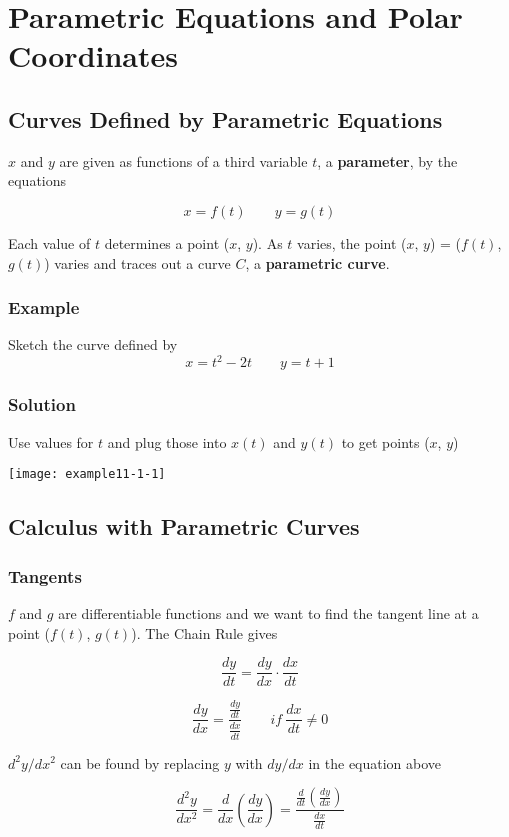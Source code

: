 \setcounter{chapter}{10}
\chapter{Parametric Equations and Polar Coordinates}

\section{Curves Defined by Parametric Equations}

$x$ and $y$ are given as functions of a third variable $t$,
a \textbf{parameter}, by the equations

$$ x = f(t) \qquad y = g(t) $$

Each value of $t$ determines a point ($x$, $y$).
As $t$ varies, the point ($x$, $y$) = ($f(t)$, $g(t)$)
varies and traces out a curve $C$, a \textbf{parametric curve}.

\subsection*{Example}

Sketch the curve defined by
$$ x = t^2-2t \qquad y = t+1 $$

\subsection*{Solution}
Use values for $t$ and plug those into $x(t)$ and $y(t)$ to get points ($x$, $y$)

\texttt{[image: example11-1-1]}

\section{Calculus with Parametric Curves}

\subsection*{Tangents}
$f$ and $g$ are differentiable functions and we want to find the
tangent line at a point ($f(t)$, $g(t)$). The Chain Rule gives

$$ \frac{dy}{dt} = \frac{dy}{dx} \cdot \frac{dx}{dt} $$

$$ \frac{dy}{dx} = \frac{\frac{dy}{dt}}{\frac{dx}{dt}} \qquad if \: \frac{dx}{dt} \neq 0$$

$d^2y/dx^2$ can be found by replacing $y$ with $dy/dx$ in the equation above

$$ \frac{d^2y}{dx^2} = \frac{d}{dx}\left(\frac{dy}{dx}\right) = \frac{\frac{d}{dt}(\frac{dy}{dx})}{\frac{dx}{dt}} $$

